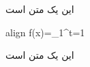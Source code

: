 \documentclass{article}
\newcommand*\diff{\mathop{}\!\mathrm{d}}
\begin{document}
این یک متن است
\begin{empheq}%
  [box={\fboxsep=10pt\colorbox{yellow}}]{align}
  f(x)=\int\limits_1^{\infty}\diff t=1
\end{empheq}
این یک متن است
\end{document}
